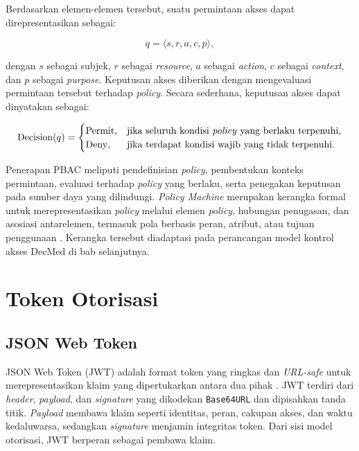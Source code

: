 \documentclass[bahasa, 12pt, a4paper, onecolumn, oneside, final]{report}
\begin{document}
Berdasarkan elemen-elemen tersebut, suatu permintaan akses dapat direpresentasikan sebagai:

\begin{equation}
	q = \langle s, r, a, c, p \rangle,
\end{equation}

dengan $s$ sebagai subjek, $r$ sebagai \textit{resource}, $a$ sebagai \textit{action}, $c$ sebagai \textit{context}, dan $p$ sebagai \textit{purpose}. Keputusan akses diberikan dengan mengevaluasi permintaan tersebut terhadap \textit{policy}. Secara sederhana, keputusan akses dapat dinyatakan sebagai:

\begin{equation}
	\operatorname{Decision}(q) =
	\begin{cases}
		\operatorname{Permit}, & \text{jika seluruh kondisi \textit{policy} yang berlaku terpenuhi}, \\
		\operatorname{Deny},   & \text{jika terdapat kondisi wajib yang tidak terpenuhi}.
	\end{cases}
\end{equation}

Penerapan PBAC meliputi pendefinisian \textit{policy}, pembentukan konteks permintaan, evaluasi terhadap \textit{policy} yang berlaku, serta penegakan keputusan pada sumber daya yang dilindungi. \textit{Policy Machine} merupakan kerangka formal untuk merepresentasikan \textit{policy} melalui elemen \textit{policy}, hubungan penugasan, dan asosiasi antarelemen, termasuk pola berbasis peran, atribut, atau tujuan penggunaan \autocite{ferraiolo2015policy}. Kerangka tersebut diadaptasi pada perancangan model kontrol akses DecMed di bab selanjutnya.
\section{Token Otorisasi}
\label{sec:token-otorisasi}

\subsection{JSON Web Token}
\label{subsec:json-web-token}

JSON Web Token (JWT) adalah format token yang ringkas dan \textit{URL-safe} untuk merepresentasikan klaim yang dipertukarkan antara dua pihak \autocite{jones2015jwt}. JWT terdiri dari \textit{header}, \textit{payload}, dan \textit{signature} yang dikodekan \texttt{Base64URL} dan dipisahkan tanda titik. \textit{Payload} membawa klaim seperti identitas, peran, cakupan akses, dan waktu kedaluwarsa, sedangkan \textit{signature} menjamin integritas token. Dari sisi model otorisasi, JWT berperan sebagai pembawa klaim.
\end{document}
